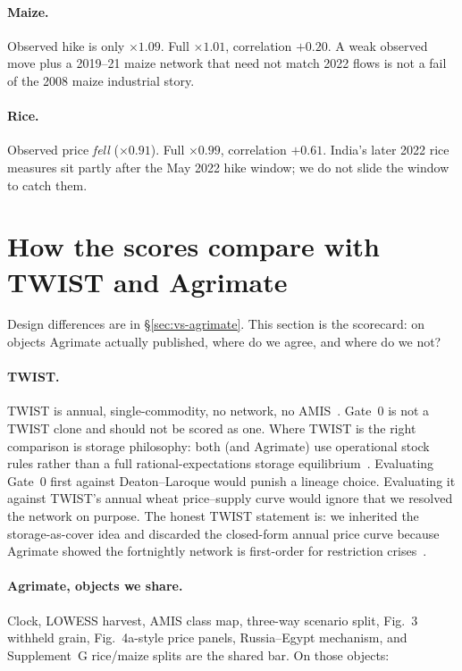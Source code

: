 \documentclass[11pt,a4paper]{article}
\begin{document}
\paragraph{Maize.}
Observed hike is only $\times 1.09$. Full $\times 1.01$, correlation
$+0.20$. A weak observed move plus a 2019--21 maize network that need not
match 2022 flows is not a fail of the 2008 maize industrial story.

\paragraph{Rice.}
Observed price \emph{fell} ($\times 0.91$). Full $\times 0.99$, correlation
$+0.61$. India's later 2022 rice measures sit partly after the May 2022
hike window; we do not slide the window to catch them.

\section{How the scores compare with TWIST and Agrimate}
\label{sec:compare}

Design differences are in \S\ref{sec:vs-agrimate}. This section is the
scorecard: on objects Agrimate actually published, where do we agree, and
where do we not?

\paragraph{TWIST.}
TWIST is annual, single-commodity, no network, no AMIS~\citep{schewe2017}.
Gate~0 is not a TWIST clone and should not be scored as one. Where TWIST
is the right comparison is storage philosophy: both (and Agrimate) use
operational stock rules rather than a full rational-expectations storage
equilibrium~\citep{deaton1992}. Evaluating Gate~0 first against
Deaton--Laroque would punish a lineage choice. Evaluating it against
TWIST's annual wheat price--supply curve would ignore that we resolved
the network on purpose. The honest TWIST statement is: we inherited the
storage-as-cover idea and discarded the closed-form annual price curve
because Agrimate showed the fortnightly network is first-order for
restriction crises~\citep{headey2011,kuhla2025}.

\paragraph{Agrimate, objects we share.}
Clock, LOWESS harvest, AMIS class map, three-way scenario split, Fig.~3
withheld grain, Fig.~4a-style price panels, Russia--Egypt mechanism, and
Supplement~G rice/maize splits are the shared bar. On those objects:
\end{document}
